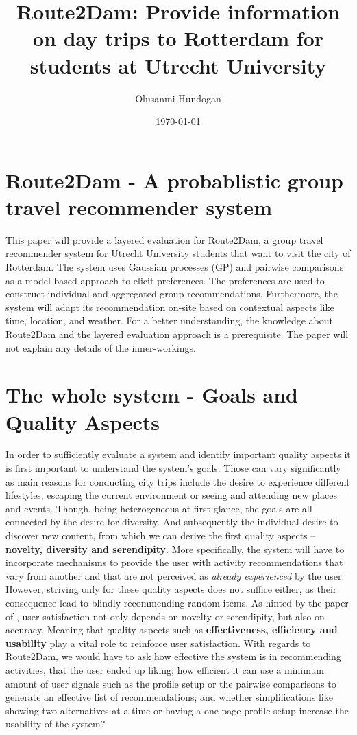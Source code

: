 \documentclass[11pt,a4paper,oneside]{article}
\title{\textbf{Route2Dam: Provide information on day trips to Rotterdam for students at Utrecht University}}
\date{\today}
\author{Olusanmi Hundogan}
\begin{document}
\maketitle

\section{Route2Dam - A probablistic group travel recommender system}
This paper will provide a layered evaluation for Route2Dam, a group travel recommender system for Utrecht University students that want to visit the city of Rotterdam. The system uses Gaussian processes (GP) and pairwise comparisons as a model-based approach to elicit preferences. The preferences are used to construct individual and aggregated group recommendations. Furthermore, the system will adapt its recommendation on-site based on contextual aspects like time, location, and weather. For a better understanding, the knowledge about Route2Dam and the layered evaluation approach is a prerequisite. The paper will not explain any details of the inner-workings.

\section{The whole system - Goals and Quality Aspects}
In order to sufficiently evaluate a system and identify important quality aspects it is first important to understand the system's goals. Those can vary significantly as main reasons for conducting city trips include the desire to experience different lifestyles, escaping the current environment or seeing and attending new places and events.\cites{gibson_TouristRolesNeeds_2002}{rita2019millennials} Though, being heterogeneous at first glance, the goals are all connected by the desire for diversity. And subsequently the individual desire to discover new content, from which we can derive the first quality aspects -- \textbf{novelty, diversity and serendipity}. More specifically, the system will have to incorporate mechanisms to provide the user with activity recommendations that vary from another and that are not perceived as \emph{already experienced} by the user. However, striving only for these quality aspects does not suffice either, as their consequence lead to blindly recommending random items. As hinted by the paper of \citeauthor{murakami_MetricsEvaluatingSerendipity_2008}, user satisfaction not only depends on novelty or serendipity, but also on accuracy.\cite{murakami_MetricsEvaluatingSerendipity_2008} Meaning that quality aspects such as \textbf{effectiveness, efficiency and usability} play a vital role to reinforce user satisfaction.\cite{ISO13586} With regards to Route2Dam, we would have to ask how effective the system is in recommending activities, that the user ended up liking; how efficient it can use a minimum amount of user signals such as the profile setup or the pairwise comparisons to generate an effective list of recommendations; and whether simplifications like showing two alternatives at a time or having a one-page profile setup increase the usability of the system? 
\end{document}
